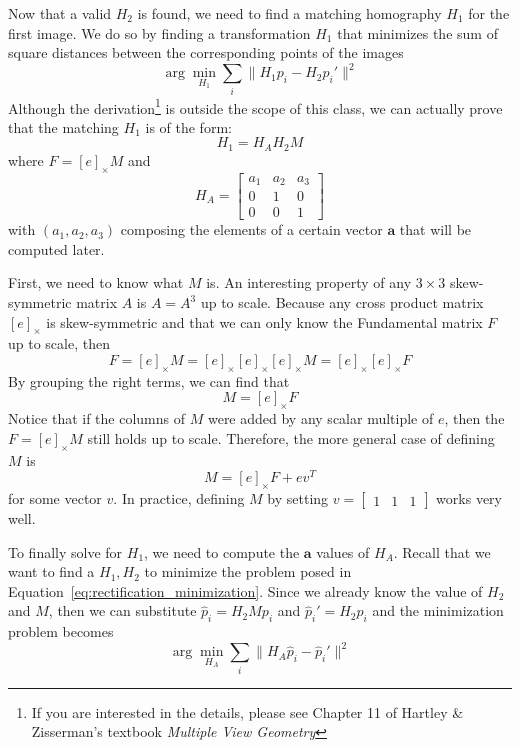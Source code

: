 \documentclass[a4paper, 12pt]{article}
\begin{document}
Now that a valid $H_2$ is found, we need to find a matching homography $H_1$ for the first image. We do so by finding a transformation $H_1$ that minimizes the sum of square distances between the corresponding points of the images
\begin{equation}
    \arg \min_{H_1} \sum_i \|H_1p_i - H_2 p_i'\|^2 
    \label{eq:rectification_minimization}
\end{equation}
Although the derivation\footnote{If you are interested in the details, please see Chapter 11 of Hartley \& Zisserman's textbook \textit{Multiple View Geometry}} is outside the scope of this class, we can actually prove that the matching $H_1$ is of the form:
\begin{equation}
    H_1 = H_A H_2 M
\label{eq:matching_homography}
\end{equation}
where $F= [e]_\times M$ and
\begin{equation}
    H_A = \begin{bmatrix} a_1 & a_2 & a_3\\ 0 & 1 & 0 \\ 0 & 0 &1\end{bmatrix}
\end{equation}
with $(a_1, a_2, a_3)$ composing the elements of a certain vector $\mathbf{a}$ that will be computed later. 

First, we need to know what $M$ is. An interesting property of any $3\times3$ skew-symmetric matrix $A$ is $A = A^3$ up to scale. Because any cross product matrix $[e]_\times$ is skew-symmetric and that we can only know the Fundamental matrix $F$ up to scale, then 
\begin{equation}
    F = [e]_\times M = [e]_\times [e]_\times [e]_\times M = [e]_\times [e]_\times F
\end{equation}
By grouping the right terms, we can find that 
\begin{equation}
    M = [e]_\times F
\end{equation}
Notice that if the columns of $M$ were added by any scalar multiple of $e$, then the $F = [e]_\times M$ still holds up to scale. Therefore, the more general case of defining $M$ is
\begin{equation}
    M = [e]_\times F + e v^T
\end{equation}
for some vector $v$. In practice, defining $M$ by setting $v=\begin{bmatrix}1 & 1 & 1\end{bmatrix}$ works very well.

To finally solve for $H_1$, we need to compute the $\mathbf{a}$ values of $H_A$. Recall that we want to find a $H_1, H_2$ to minimize the problem posed in Equation~\ref{eq:rectification_minimization}. Since we already know the value of $H_2$ and $M$, then we can substitute $\hat{p}_i = H_2Mp_i$ and $\hat{p}_i' = H_2p_i$ and the minimization problem becomes
\begin{equation}
\arg \min_{H_A} \sum_i \|H_A\hat{p}_i - \hat{p}_i'\|^2 
\end{equation}
\end{document}
